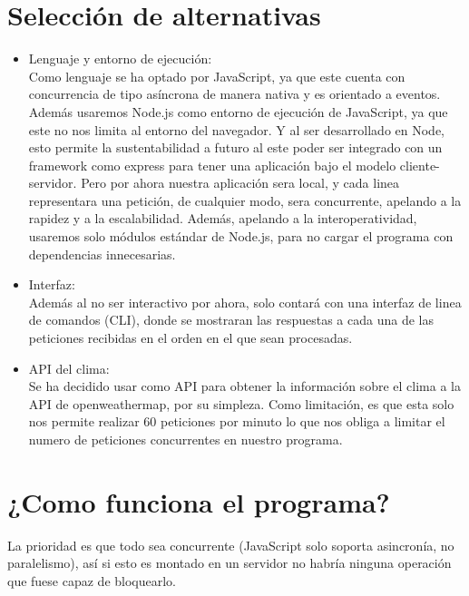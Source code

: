 \documentclass{report}
\begin{document}
\section{Selección de alternativas}
\begin{itemize}
\item Lenguaje y entorno de ejecución:\\
    Como lenguaje se ha optado por JavaScript, ya que este cuenta con concurrencia de tipo asíncrona de manera nativa y  es orientado a eventos.
    Además usaremos Node.js como entorno de ejecución de JavaScript, ya que este no nos limita al entorno del navegador. Y al ser desarrollado en Node, esto permite la sustentabilidad a futuro al este poder ser integrado con un framework como express para tener una aplicación bajo el modelo cliente-servidor.
    Pero por ahora nuestra aplicación sera local, y cada linea representara una petición, de cualquier modo, sera concurrente, apelando a la rapidez y a la escalabilidad. Además, apelando a la interoperatividad, usaremos solo módulos estándar de Node.js, para no cargar el programa con dependencias innecesarias.
\item Interfaz:\\
    Además al no ser interactivo por ahora, solo contará con una interfaz de linea de comandos (CLI), donde se mostraran las respuestas a cada una de las peticiones recibidas en el orden en el que sean procesadas.
\item API del clima:\\
    Se ha decidido usar como API para obtener la información sobre el clima a la API de openweathermap, por su simpleza. Como limitación, es que esta solo nos permite realizar 60 peticiones por minuto lo que nos obliga a limitar el numero de peticiones concurrentes en nuestro programa.
\end{itemize}
\section{¿Como funciona el programa?}
La prioridad es que todo sea concurrente (JavaScript solo soporta asincronía, no paralelismo), así si esto es montado en un servidor no habría ninguna operación que fuese capaz de bloquearlo.
\end{document}

